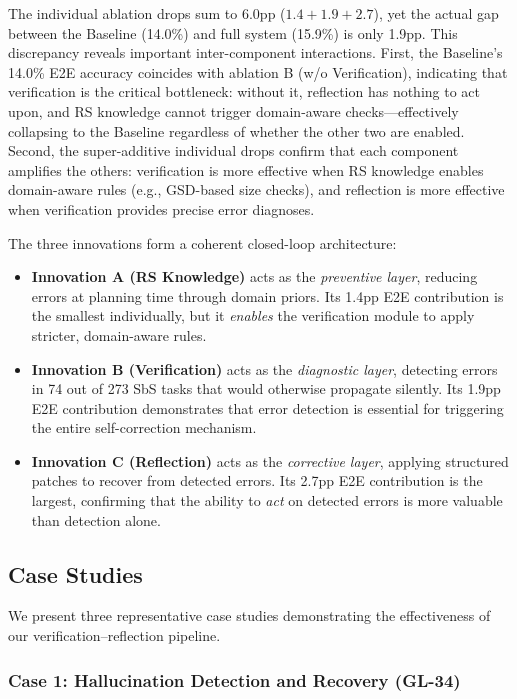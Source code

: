 \documentclass[journal]{IEEEtran}
\begin{document}
The individual ablation drops sum to 6.0pp ($1.4 + 1.9 + 2.7$), yet the actual gap between the Baseline (14.0\%) and full system (15.9\%) is only 1.9pp.
This discrepancy reveals important inter-component interactions.
First, the Baseline's 14.0\% E2E accuracy coincides with ablation B (w/o Verification), indicating that verification is the critical bottleneck: without it, reflection has nothing to act upon, and RS knowledge cannot trigger domain-aware checks---effectively collapsing to the Baseline regardless of whether the other two are enabled.
Second, the super-additive individual drops confirm that each component amplifies the others: verification is more effective when RS knowledge enables domain-aware rules (e.g., GSD-based size checks), and reflection is more effective when verification provides precise error diagnoses.

The three innovations form a coherent closed-loop architecture:
\begin{itemize}[leftmargin=*]
    \item \textbf{Innovation A (RS Knowledge)} acts as the \emph{preventive layer}, reducing errors at planning time through domain priors. Its 1.4pp E2E contribution is the smallest individually, but it \emph{enables} the verification module to apply stricter, domain-aware rules.
    \item \textbf{Innovation B (Verification)} acts as the \emph{diagnostic layer}, detecting errors in 74 out of 273 SbS tasks that would otherwise propagate silently. Its 1.9pp E2E contribution demonstrates that error detection is essential for triggering the entire self-correction mechanism.
    \item \textbf{Innovation C (Reflection)} acts as the \emph{corrective layer}, applying structured patches to recover from detected errors. Its 2.7pp E2E contribution is the largest, confirming that the ability to \emph{act} on detected errors is more valuable than detection alone.
\end{itemize}


\subsection{Case Studies}
\label{subsec:case_studies}

We present three representative case studies demonstrating the effectiveness of our verification--reflection pipeline.

\subsubsection{Case 1: Hallucination Detection and Recovery (GL-34)}
\end{document}

